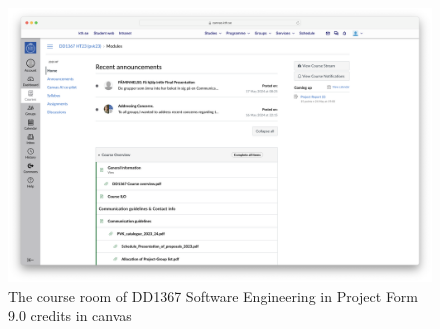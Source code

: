 \begin{figure}[H]
    \centering
    \includegraphics[width=\textwidth]{content/figures/assets/16-canvas-course-room.png}
    \caption{The course room of DD1367 Software Engineering in Project Form 9.0 credits in canvas}
    \label{fig:canvas_course_room}
\end{figure}
